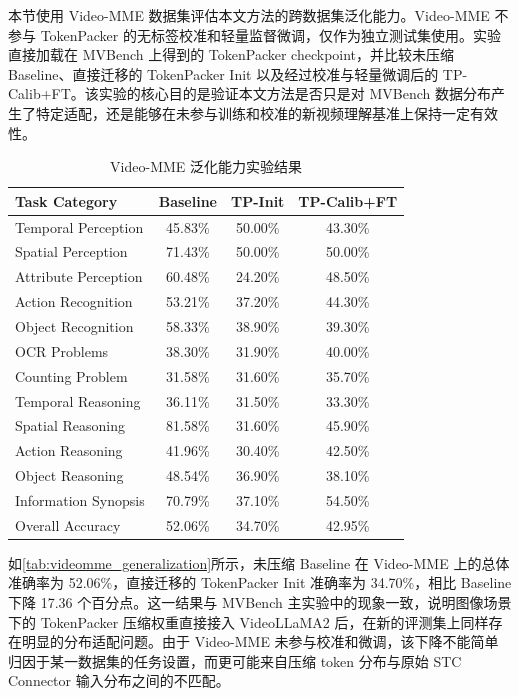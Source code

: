 本节使用 Video-MME 数据集评估本文方法的跨数据集泛化能力。Video-MME 不参与 TokenPacker 的无标签校准和轻量监督微调，仅作为独立测试集使用。实验直接加载在 MVBench 上得到的 TokenPacker checkpoint，并比较未压缩 Baseline、直接迁移的 TokenPacker Init 以及经过校准与轻量微调后的 TP-Calib+FT。该实验的核心目的是验证本文方法是否只是对 MVBench 数据分布产生了特定适配，还是能够在未参与训练和校准的新视频理解基准上保持一定有效性。

\begin{table}[!htbp]
    \centering
    \setlength{\tabcolsep}{6pt}
    \renewcommand{\arraystretch}{0.75}
    \caption{\label{tab:videomme_generalization}Video-MME 泛化能力实验结果}
    \begin{tabular*}{\textwidth}{@{\extracolsep{\fill}}l c c c@{}}
        \toprule
        Task Category & Baseline & TP-Init & TP-Calib+FT \\
        \midrule
        Temporal Perception & 45.83\% & 50.00\% & 43.30\% \\
        Spatial Perception & 71.43\% & 50.00\% & 50.00\% \\
        Attribute Perception & 60.48\% & 24.20\% & 48.50\% \\
        Action Recognition & 53.21\% & 37.20\% & 44.30\% \\
        Object Recognition & 58.33\% & 38.90\% & 39.30\% \\
        OCR Problems & 38.30\% & 31.90\% & 40.00\% \\
        Counting Problem & 31.58\% & 31.60\% & 35.70\% \\
        Temporal Reasoning & 36.11\% & 31.50\% & 33.30\% \\
        Spatial Reasoning & 81.58\% & 31.60\% & 45.90\% \\
        Action Reasoning & 41.96\% & 30.40\% & 42.50\% \\
        Object Reasoning & 48.54\% & 36.90\% & 38.10\% \\
        Information Synopsis & 70.79\% & 37.10\% & 54.50\% \\
        \midrule
        Overall Accuracy & 52.06\% & 34.70\% & 42.95\% \\
        \bottomrule
    \end{tabular*}
\end{table}

如\autoref{tab:videomme_generalization}所示，未压缩 Baseline 在 Video-MME 上的总体准确率为 52.06\%，直接迁移的 TokenPacker Init 准确率为 34.70\%，相比 Baseline 下降 17.36 个百分点。这一结果与 MVBench 主实验中的现象一致，说明图像场景下的 TokenPacker 压缩权重直接接入 VideoLLaMA2 后，在新的评测集上同样存在明显的分布适配问题。由于 Video-MME 未参与校准和微调，该下降不能简单归因于某一数据集的任务设置，而更可能来自压缩 token 分布与原始 STC Connector 输入分布之间的不匹配。

